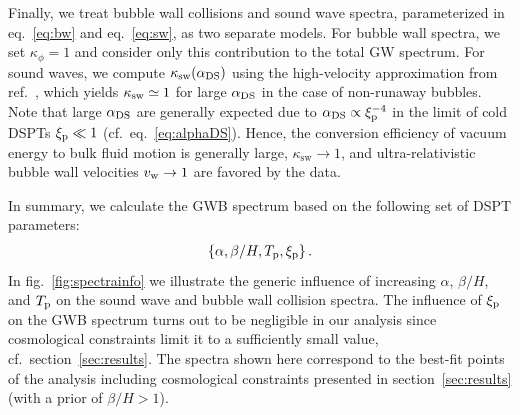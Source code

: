 Finally, we treat bubble wall collisions and sound wave spectra, parameterized in eq.~\eqref{eq:bw} and eq.~\eqref{eq:sw}, as two separate models. For bubble wall spectra, we set $\kappa_\phi = 1$ and consider only this contribution to the total \ac{GW} spectrum. For sound waves, we compute $\kappa_{\text{sw}}(\alpha_{\text{DS}})$ using the high-velocity approximation from ref.~\cite{Espinosa:2010hh}, which yields $\kappa_{\text{sw}} \simeq 1$ for large $\alpha_{\text{DS}}$ in the case of non-runaway bubbles.  Note that large $\alpha_{\text{DS}}$ are generally expected due to $\alpha_{\text{DS}} \propto \xi_{\text{p}}^{-4}$ in the limit of cold \acp{DSPT} $\xi_{\text{p}} \ll 1$ (cf.~eq.~\eqref{eq:alphaDS}). Hence, the conversion efficiency of vacuum energy to bulk fluid motion is generally large, $\kappa_\text{sw} \rightarrow 1$, and ultra-relativistic bubble wall velocities $v_\mathrm{w} \rightarrow 1$ are favored by the data.

In summary, we calculate the \ac{GWB} spectrum based on the following set of \ac{DSPT} parameters:
\begin{align}
	\left\{ \alpha, \beta/H, T_{\text{p}}, \xi_{\text{p}} \right\}  .
\end{align}
In fig.~\ref{fig:spectrainfo} we illustrate the generic influence of increasing $\alpha$, $\beta/H$, and $T_{\text{p}}$ on the sound wave and bubble wall collision spectra. The influence of $\xi_{\text{p}}$ on the \ac{GWB} spectrum turns out to be negligible in our analysis  since cosmological constraints limit it to a sufficiently small value, cf.~section~\ref{sec:results}. The spectra shown here correspond to the best-fit points of the analysis including cosmological constraints presented in section~\ref{sec:results} (with a prior of $\beta/H>1$).

